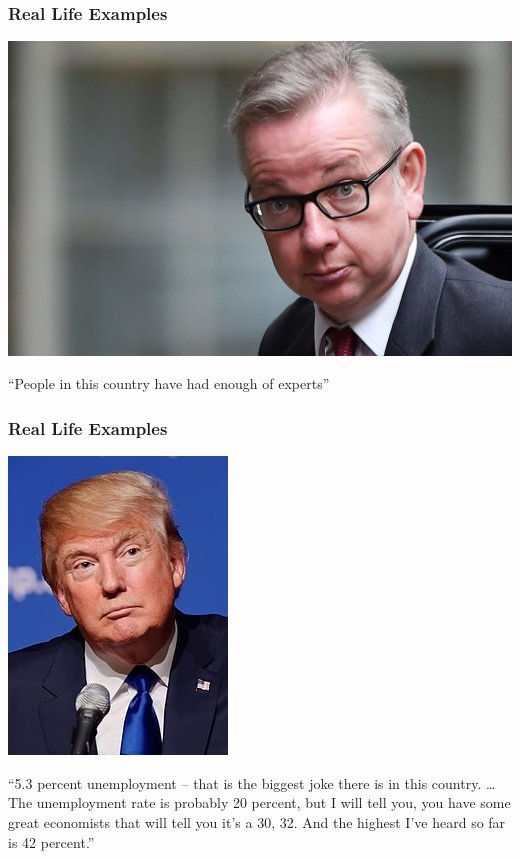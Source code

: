 \documentclass{beamer}
\begin{document}
\begin{frame}
	\frametitle{Real Life Examples}
	\begin{center}
		\includegraphics[scale=0.1]{./images/michael_gove.jpg}
	\end{center}
	\centering
	``People in this country have had enough of experts''
\end{frame}

\begin{frame}
	\frametitle{Real Life Examples}
	\begin{center}
		\includegraphics[scale=0.5]{./images/trump.jpg}
	\end{center}
	\centering
	``5.3 percent unemployment -- that is the biggest joke there is in this country. … The 				unemployment rate is probably 20 percent, but I will tell you, you have some great economists 		that will tell you it's a 30, 32. And the highest I've heard so far is 42 percent.''
\end{frame}
\end{document}
